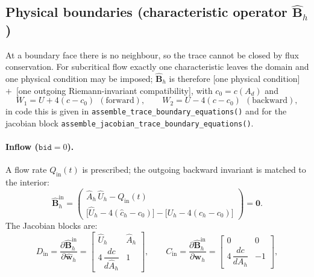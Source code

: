 \documentclass[11pt]{article}
\begin{document}
\subsection{Physical boundaries (characteristic operator $\widehat{\mathbf
B}_h$)}

At a boundary face there is no neighbour, so the trace cannot be closed by flux
conservation. For subcritical flow exactly one characteristic leaves the domain
and one physical condition may be imposed; $\widehat{\mathbf B}_h$ is therefore
[one physical condition]~$+$~[one outgoing Riemann-invariant compatibility],
with $c_0=c(A_d)$ and
\begin{equation}
  W_1 = U + 4(c-c_0)\ \ (\text{forward}),
  \qquad
  W_2 = U - 4(c-c_0)\ \ (\text{backward}),
\end{equation}
in code this is given in \texttt{assemble\_trace\_boundary\_equations()} and for the jacobian block \texttt{assemble\_jacobian\_trace\_boundary\_equations()}.


\paragraph{Inflow ($\mathtt{bid}=0$).} A flow rate $Q_{\mathrm{in}}(t)$ is
prescribed; the outgoing backward invariant is matched to the interior:
\begin{equation}
  \widehat{\mathbf B}_h^{\mathrm{in}}
  =
  \begin{pmatrix}
  \widehat A_h\,\widehat U_h - Q_{\mathrm{in}}(t)\\[6pt]
  \bigl[\widehat U_h-4(\widehat c_h-c_0)\bigr]
  -\bigl[U_h-4(c_h-c_0)\bigr]
  \end{pmatrix}
  =\mathbf 0 .
  \label{eq:bc_inflow}
\end{equation}
The Jacobian blocks are:
\begin{equation}
D_{\mathrm{in}}
=
\frac{\partial\widehat{\mathbf B}_h^{\mathrm{in}}}
     {\partial\widehat{\mathbf{w}}_h}
=
\begin{bmatrix}
\widehat{U}_h & \widehat{A}_h
\\[8pt]
4\,\dfrac{dc}{d\widehat{A}_h} & 1
\end{bmatrix},
\qquad
C_{\mathrm{in}}
=
\frac{\partial\widehat{\mathbf B}_h^{\mathrm{in}}}
     {\partial\mathbf{w}_h}
=
\begin{bmatrix}
0 & 0
\\[8pt]
4\,\dfrac{dc}{dA_h} & -1
\end{bmatrix},
\label{eq:inflow_jacobian}
\end{equation}
\end{document}
